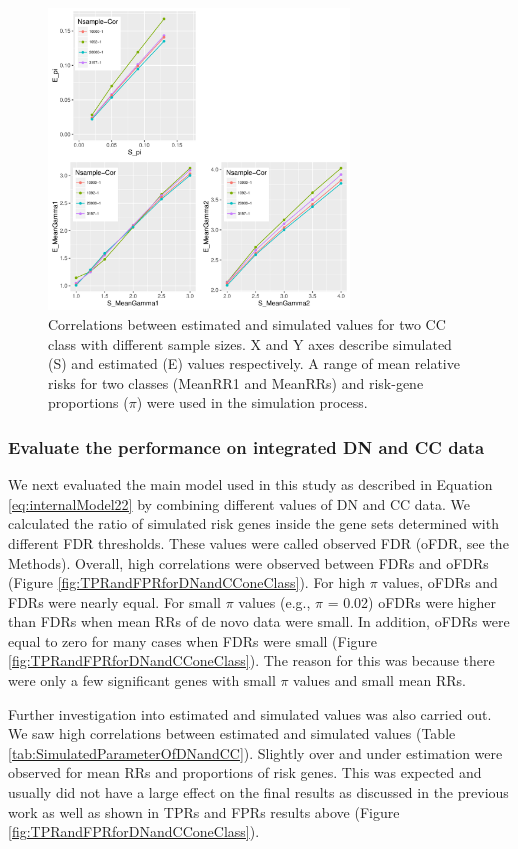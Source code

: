 \documentclass[]{article}
\begin{document}
\begin{figure}[ht]
\centering
\includegraphics[width=\textwidth,height=8cm]{Picture/PUB2OnlyCCnSample.pdf}
\caption{Correlations between estimated and simulated values for two
  CC class with different sample sizes.  X and Y axes describe simulated (S) and estimated (E)
  values respectively. A range of mean relative risks for two classes
  (MeanRR1 and MeanRRs) and risk-gene proportions ($\pi$) were used in
  the simulation process.}
\label{tab:CorrelationTwoClassCC}
\end{figure}

\subsubsection{Evaluate the performance on integrated DN and CC data}

We next evaluated the main model used in this study as described in Equation
\ref{eq:internalModel22} by combining different values of DN and CC data.
We calculated the ratio of simulated risk genes inside the gene
sets determined with different FDR thresholds. These values were
called observed FDR (oFDR, see the Methods). Overall, high
correlations were observed between FDRs and oFDRs (Figure
\ref{fig:TPRandFPRforDNandCConeClass}). For high $\pi$ values, oFDRs
and FDRs were nearly equal. For small $\pi$ values (e.g., $\pi$ =
0.02) oFDRs were higher than FDRs when mean RRs of de novo data were
small. In addition, oFDRs were equal to zero for many cases when
FDRs were small (Figure \ref{fig:TPRandFPRforDNandCConeClass}). The reason for this was because there were only a few
significant genes with small $\pi$ values and small mean
RRs.


Further investigation into estimated and simulated values was also
carried out. We saw high correlations between estimated and simulated
values (Table \ref{tab:SimulatedParameterOfDNandCC}).
Slightly over and under estimation were observed for mean RRs and
proportions of risk genes. This was
expected and usually did not have a large effect on the final results as discussed
in the previous work \citep{he2013integrated} as well as shown in TPRs
and FPRs results above (Figure \ref{fig:TPRandFPRforDNandCConeClass}).
\end{document}
